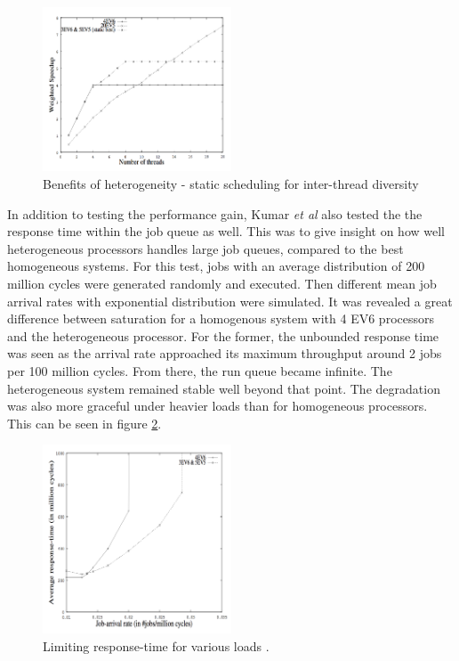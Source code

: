 \begin{figure}[htb]
    \centering
    \includegraphics[width=0.5\textwidth]{Figures/Heterogeneous/Kumar2}
    \caption{Benefits of heterogeneity - static scheduling for inter-thread diversity \cite{heterogeneous-perf}}
    \label{fig:Kumar2}
\end{figure}

In addition to testing the performance gain, Kumar \textit{et al} also tested the the response time within the job queue as well.
This was to give insight on how well heterogeneous processors handles large job queues, compared to the best homogeneous systems.
For this test, jobs with an average distribution of 200 million cycles were generated randomly and executed.
Then different mean job arrival rates with exponential distribution were simulated.
It was revealed a great difference between saturation for a homogenous system with 4 EV6 processors and the heterogeneous processor.
For the former, the unbounded response time was seen as the arrival rate approached its maximum throughput around 2 jobs per 100 million cycles.
From there, the run queue became infinite. %
The heterogeneous system remained stable well beyond that point.
The degradation was also more graceful under heavier loads than for homogeneous processors.
This can be seen in figure \ref{fig:Kumar3}.

\begin{figure}[htb]
    \centering
    \includegraphics[width=0.5\textwidth]{Figures/Heterogeneous/Kumar3}
    \caption{Limiting response-time for various loads \cite{heterogeneous-perf}.}
    \label{fig:Kumar3}
\end{figure}

